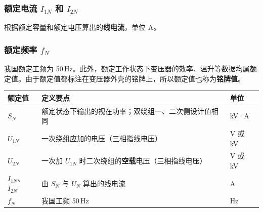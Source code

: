 \subsubsection{额定电流 $I_{1N}$ 和 $I_{2N}$}
根据额定容量和额定电压算出的\textbf{线电流}，单位 A。


\subsubsection{额定频率 $f_N$}
我国额定工频为 50\,Hz。此外，额定工作状态下变压器的效率、温升等数据均属额定值。由于额定值都标注在变压器外壳的铭牌上，所以额定值也称为\textbf{铭牌值}。

\begin{center}
\begin{tabular}{@{}lll@{}}
\toprule
额定值 & 定义要点 & 单位 \\
\midrule
$S_N$ & 额定状态下输出的视在功率；双绕组一、二次侧设计值相同 & kV·A \\
$U_{1N}$ & 一次绕组应加的电压（三相指线电压） & V 或 kV \\
$U_{2N}$ & 一次加 $U_{1N}$ 时二次绕组的\textbf{空载}电压（三相指线电压） & V 或 kV \\
$I_{1N}$、$I_{2N}$ & 由 $S_N$ 与 $U_N$ 算出的线电流 & A \\
$f_N$ & 我国工频 50\,Hz & Hz \\
\bottomrule
\end{tabular}
\end{center}

